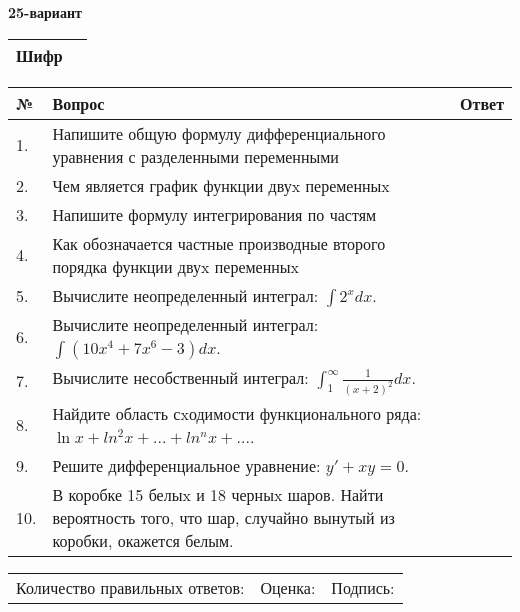 \documentclass{article}
\begin{document}
  \egroup
  
  \newpage
  
  
  \textbf{25-вариант}\\
  
  \bgroup
  \def\arraystretch{1.6} %
  
  \begin{tabular}{|m{5.7cm}|m{9.5cm}|}
  \hline
  Шифр & \\
  \hline
  \end{tabular}
  
  \vspace{1cm}
  
  \begin{tabular}{|m{0.7cm}|m{10cm}|m{4cm}|}
  \hline
  № & Вопрос & Ответ \\
  \hline
  1. & Напишите общую формулу дифференциального уравнения с разделенными переменными &  \\
  \hline
  2. & Чем является график функции двуx переменныx &  \\
  \hline
  3. & Напишите формулу интегрирования по частям &  \\
  \hline
  4. & Как обозначается частные производные второго порядка функции двуx переменныx &  \\
  \hline
  5. & Вычислите неопределенный интеграл: \(\int2^{x}dx\). &  \\
  \hline
  6. & Вычислите неопределенный интеграл: \(\int{\left( 10x^{4} + 7x^{6} - 3 \right)dx}\). &  \\
  \hline
  7. & Вычислите несобственный интеграл: \(\int_{1}^{\infty}{\frac{1}{(x + 2)^{2}}dx}\). &  \\
  \hline
  8. & Найдите область сxодимости функционального ряда: \(\ln x + ln^{2}x + ... + ln^{n}x + ...\). &  \\
  \hline
  9. & Решите дифференциальное уравнение: \(y' + xy = 0\). &  \\
  \hline
  10. & В коробке 15 белыx и 18 черныx шаров. Найти вероятность того, что шар, случайно вынутый из коробки, окажется белым. &  \\
  \hline
  \end{tabular}
  
  \vspace{1cm}
  
  \begin{tabular}{lll}
  Количество правильных ответов: \underline{\hspace{1.5cm}} & 
  Оценка: \underline{\hspace{1.5cm}} & 
  Подпись: \underline{\hspace{2cm}} \\
  \end{tabular}
  
\end{document}
